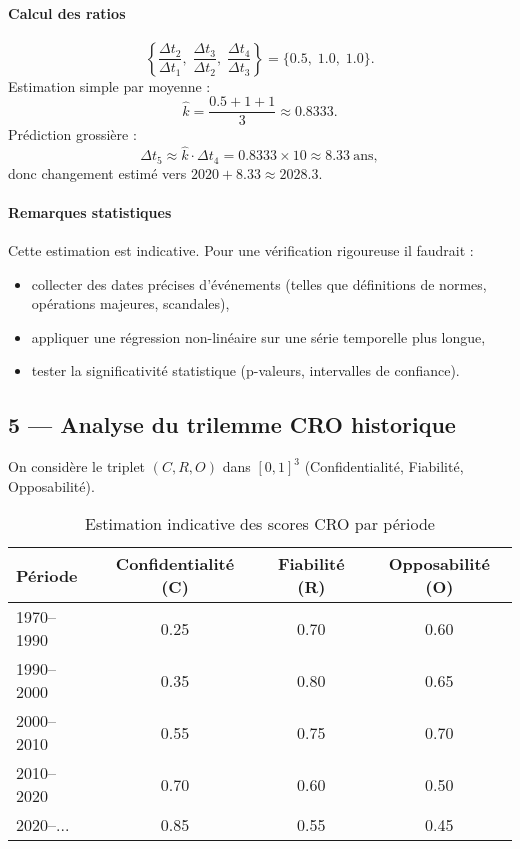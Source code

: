 \documentclass[12pt,a4paper]{article}
\begin{document}
\paragraph{Calcul des ratios}
\[
\left\{ \frac{\Delta t_{2}}{\Delta t_1},\; \frac{\Delta t_3}{\Delta t_2},\; \frac{\Delta t_4}{\Delta t_3} \right\}
=
\{0.5,\;1.0,\;1.0\}.
\]
Estimation simple par moyenne :
\[
\hat{k} = \frac{0.5+1+1}{3} \approx 0.8333.
\]
Prédiction grossière :
\[
\Delta t_5 \approx \hat{k}\cdot \Delta t_4 = 0.8333 \times 10 \approx 8.33 \ \text{ans},
\]
donc changement estimé vers $2020 + 8.33 \approx 2028.3$.

\paragraph{Remarques statistiques}
Cette estimation est indicative. Pour une vérification rigoureuse il faudrait :
\begin{itemize}
  \item collecter des dates précises d'événements (telles que définitions de normes, opérations majeures, scandales),
  \item appliquer une régression non-linéaire sur une série temporelle plus longue,
  \item tester la significativité statistique (p-valeurs, intervalles de confiance).
\end{itemize}

\subsection{5 — Analyse du trilemme CRO historique}
On considère le triplet $(C,R,O)$ dans $[0,1]^3$ (Confidentialité, Fiabilité, Opposabilité).

\begin{table}[h]
  \centering
  \caption{Estimation indicative des scores CRO par période}
  \begin{tabular}{l c c c}
    \toprule
    Période & Confidentialité (C) & Fiabilité (R) & Opposabilité (O) \\
    \midrule
    1970--1990 & 0.25 & 0.70 & 0.60 \\
    1990--2000 & 0.35 & 0.80 & 0.65 \\
    2000--2010 & 0.55 & 0.75 & 0.70 \\
    2010--2020 & 0.70 & 0.60 & 0.50 \\
    2020--...  & 0.85 & 0.55 & 0.45 \\
    \bottomrule
  \end{tabular}
\end{table}
\end{document}

